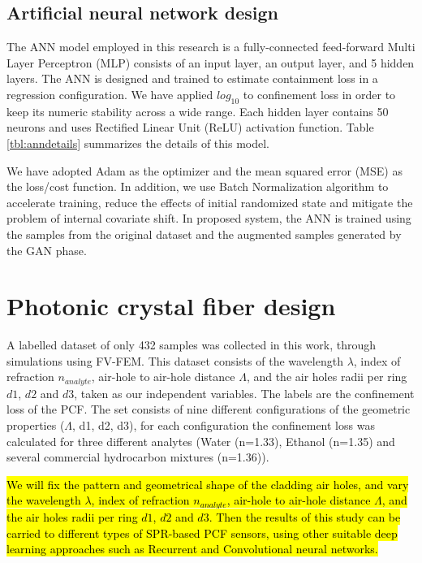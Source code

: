 \documentclass[draft, 10pt]{IEEEtran}
\begin{document}
\subsection{Artificial neural network design}
\label{ssec:ann}

The ANN model employed in this research is a fully-connected feed-forward Multi Layer Perceptron (MLP) consists of an input layer, an output layer, and 5 hidden layers. The ANN is designed and trained to estimate containment loss in a regression configuration. We have applied $log_{10}$ to confinement loss in order to keep its numeric stability across a wide range. Each hidden layer contains 50 neurons and uses Rectified Linear Unit (ReLU) activation function. Table \ref{tbl:anndetails} summarizes the details of this model. 

We have adopted Adam \cite{kingma2014adam} as the optimizer and the mean squared error (MSE) as the loss/cost function. In addition, we use Batch Normalization algorithm \cite{ioffe2015batch} to accelerate training, reduce the effects of initial randomized state and mitigate the problem of internal covariate shift. In proposed system, the ANN is trained using the samples from the original dataset and the augmented samples generated by the GAN phase.


\section{Photonic crystal fiber design}
\label{sec:pcf}

A labelled dataset of only 432 samples was collected in this work, through simulations using FV-FEM. This dataset consists of the wavelength $\lambda$, index of refraction $n_{analyte} $, air-hole to air-hole distance $ \Lambda $, and the air holes radii per ring $d1$, $d2$ and $d3$, taken as our independent variables. The labels are the confinement loss of the PCF. The set consists of nine different configurations of the geometric properties ($ \Lambda $, d1, d2, d3), for each configuration the confinement loss was calculated for three different analytes (Water (n=1.33), Ethanol (n=1.35) and several commercial hydrocarbon mixtures (n=1.36)).

\hl{We will fix the pattern and geometrical shape of the cladding air holes, and vary the wavelength $\lambda$, index of refraction $n_{analyte} $, air-hole to air-hole distance $ \Lambda $, and the air holes radii per ring $d1$, $d2$ and $d3$. Then the results of this study can be carried to different types of SPR-based PCF sensors, using other suitable deep learning approaches such as Recurrent and Convolutional neural networks. }
\end{document}
